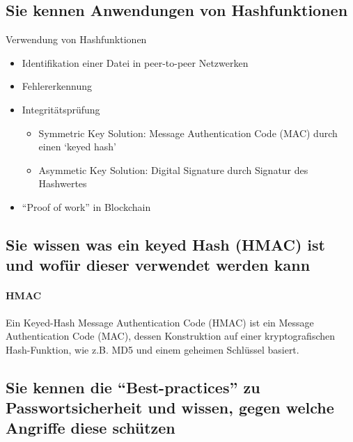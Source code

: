 \documentclass[10pt,a4paper]{article}
\begin{document}
\subsection*{Sie kennen Anwendungen von Hashfunktionen}
Verwendung von Hashfunktionen
\begin{itemize}[noitemsep,topsep=0pt,leftmargin=*]
    \item Identifikation einer Datei in peer-to-peer Netzwerken
    \item Fehlererkennung
    \item Integritätsprüfung
    \begin{itemize}[noitemsep,topsep=0pt,leftmargin=*]
        \item Symmetric Key Solution: Message Authentication Code (MAC) durch einen `keyed hash'
        \item Asymmetic Key Solution: Digital Signature durch Signatur des Hashwertes
    \end{itemize}
    \item "`Proof of work"' in Blockchain
\end{itemize}


\subsection*{Sie wissen was ein keyed Hash (HMAC) ist und wofür dieser verwendet werden kann}

\paragraph*{HMAC}Ein Keyed-Hash Message Authentication Code (HMAC) ist ein Message Authentication Code (MAC), dessen Konstruktion auf einer kryptografischen Hash-Funktion, wie z.B. MD5 und einem geheimen Schlüssel basiert.



\subsection*{Sie kennen die "`Best-practices"' zu Passwortsicherheit und wissen, gegen welche Angriffe diese schützen}
\end{document}
